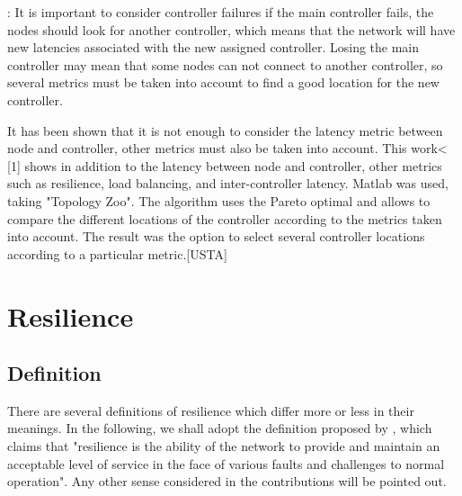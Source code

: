 \documentclass[a4paper,10pt]{article}
\begin{document}
\cite{HoGe14}: It is important to consider controller failures if the main controller fails, the nodes should look for another controller, which means that the network will have new latencies associated with the new assigned controller. Losing the main controller may mean that some nodes can not connect to another controller, so several metrics must be taken into account to find a good location for the new controller.

It has been shown that it is not enough to consider the latency metric between node and controller, other metrics must also be taken into account. This work< [1] shows in addition to the latency between node and controller, other metrics such as resilience, load balancing, and inter-controller latency. Matlab was used, taking "Topology Zoo". The algorithm uses the Pareto optimal and allows to compare the different locations of the controller according to the metrics taken into account. The result was the option to select several controller locations according to a particular metric.[USTA]



\section{Resilience}
\subsection{Definition}
There are several definitions of resilience which differ more or less in their meanings. In the following, we shall adopt the definition proposed by \cite{StHu07}, which claims that   "resilience is the ability of the network to provide and maintain an acceptable level of service in the face of various faults and challenges to normal operation".  Any other sense considered in the contributions will be pointed out.

 


\end{document}
